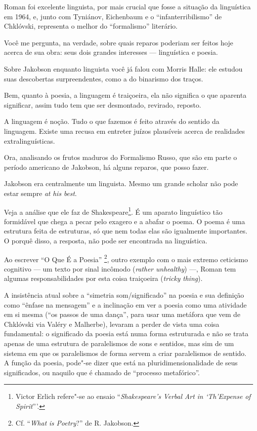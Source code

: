 {Roman foi excelente linguista, por mais crucial que fosse a situação da
linguística em 1964, e, junto com Tyniánov, Eichenbaum e o
``infanterribilismo'' de Chklóvski, representa o melhor do
``formalismo'' literário.

Você me pergunta, na verdade, sobre quais reparos poderiam ser feitos
hoje acerca de sua obra: seus dois grandes interesses --- linguística e
poesia.

Sobre Jakobson enquanto linguista você já falou com Morris Halle: ele
estudou suas descobertas surpreendentes, como a do binarismo dos traços.

Bem, quanto à poesia, a linguagem é traiçoeira, ela não significa o que
aparenta significar, assim tudo tem que ser desmontado, revirado,
reposto.

A linguagem é noção. Tudo o que fazemos é feito através do sentido da
linguagem. Existe uma recusa em entreter juízos plausíveis acerca de
realidades extralinguísticas.

Ora, analisando os frutos maduros do Formalismo Russo, que são em parte
o período americano de Jakobson, há alguns reparos, que posso fazer.

Jakobson era centralmente um linguista. Mesmo um grande scholar não pode
estar sempre \emph{at his best}.

Veja a análise que ele faz de Shakespeare\footnote{Victor Erlich
  refere"-se ao ensaio ``\emph{Shakespeare's Verbal Art in `Th'Expense of
  Spirit}'''.}. É um aparato linguístico tão formidável que chega a
pecar pelo exagero e a abafar o poema. O poema é uma estrutura feita de
estruturas, só que nem todas elas são igualmente importantes. O porquê
disso, a resposta, não pode ser encontrada na linguística.

Ao escrever ``O Que É a Poesia'' \footnote{Cf. ``\emph{What is
  Poetry}?'' de R. Jakobson.}, outro exemplo com o mais extremo
ceticismo cognitivo --- um texto por sinal incômodo (\emph{rather
unhealthy}) ---, Roman tem algumas responsabilidades por esta coisa
traiçoeira (\emph{tricky thing}).

A insistência atual sobre a ``simetria som/significado'' na poesia e sua
definição como ``ênfase na mensagem'' e a inclinação em ver a poesia
como uma atividade em si mesma (``os passos de uma dança'', para usar
uma metáfora que vem de Chklóvski via Valéry e Malherbe), levaram a
perder de vista uma coisa fundamental: o significado da poesia está numa
forma estruturada e não se trata apenas de uma estrutura de paralelismos
de sons e sentidos, mas sim de um sistema em que os paralelismos de
forma servem a criar paralelismos de sentido. A função da poesia,
pode"-se dizer que está na pluridimensionalidade de seus significados, ou
naquilo que é chamado de ``processo metafórico''.

}

